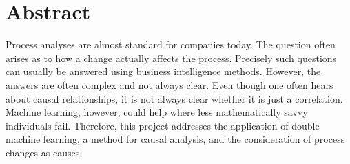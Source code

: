 \chapter*{Abstract}
Process analyses are almost standard for companies today. The question often arises as to how a change actually affects the process. Precisely such questions can usually be answered using business intelligence methods. However, the answers are often complex and not always clear. Even though one often hears about causal relationships, it is not always clear whether it is just a correlation. Machine learning, however, could help where less mathematically savvy individuals fail. Therefore, this project addresses the application of double machine learning, a method for causal analysis, and the consideration of process changes as causes.
\clearpage

\ohead{\pagemark}

\tableofcontents

\listoffigures
{}

\listoftables
{}
\clearpage